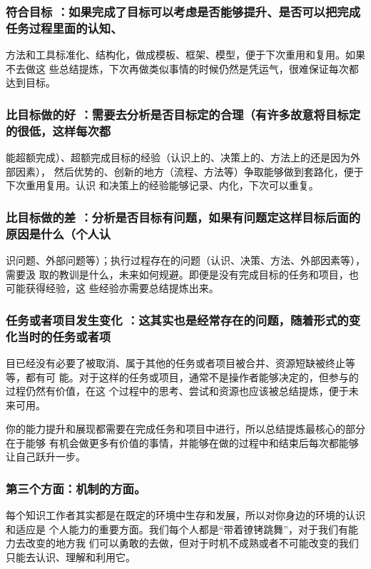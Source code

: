 \documentclass[11pt]{ctexart}
\begin{document}
{{{{\subsubsection{符合目标 ：如果完成了目标可以考虑是否能够提升、是否可以把完成任务过程里面的认知、}
\label{sec:orga3425ec}
方法和工具标准化、结构化，做成模板、框架、模型，便于下次重用和复用。如果不去做这
些总结提炼，下次再做类似事情的时候仍然是凭运气，很难保证每次都达到目标。

\subsubsection{比目标做的好 ：需要去分析是否目标定的合理（有许多故意将目标定的很低，这样每次都}
\label{sec:org0a5b125}
能超额完成）、超额完成目标的经验（认识上的、决策上的、方法上的还是因为外部因素），
然后优势的、创新的地方（流程、方法等）争取能够做到套路化，便于下次重用复用。认识
和决策上的经验能够记录、内化，下次可以重复。

\subsubsection{比目标做的差 ：分析是否目标有问题，如果有问题定这样目标后面的原因是什么（个人认}
\label{sec:orge24745d}
识问题、外部问题等）；执行过程存在的问题（认识、决策、方法、外部因素等），需要汲
取的教训是什么，未来如何规避。即便是没有完成目标的任务和项目，也可能获得经验，这
些经验亦需要总结提炼出来。

\subsubsection{任务或者项目发生变化 ：这其实也是经常存在的问题，随着形式的变化当时的任务或者项}
\label{sec:org27e5b9b}
目已经没有必要了被取消、属于其他的任务或者项目被合并、资源短缺被终止等等，都有可
能。对于这样的任务或项目，通常不是操作者能够决定的，但参与的过程仍然有价值，在这
个过程中的思考、尝试和资源也应该被总结提炼，便于未来可用。

你的能力提升和展现都需要在完成任务和项目中进行，所以总结提炼最核心的部分在于能够
有机会做更多有价值的事情，并能够在做的过程中和结束后每次都能够让自己跃升一步。

\subsubsection{第三个方面：机制的方面。}
\label{sec:org17361d4}

每个知识工作者其实都是在既定的环境中生存和发展，所以对你身边的环境的认识和适应是
个人能力的重要方面。我们每个人都是“带着镣铐跳舞”，对于我们有能力去改变的地方我
们可以勇敢的去做，但对于时机不成熟或者不可能改变的我们只能去认识、理解和利用它。

}}}}
\end{document}
